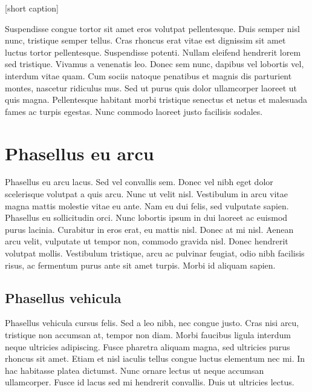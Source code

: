 \begin{center}
[short caption]{%
\kant[1-2]}
\end{center}

Suspendisse congue tortor sit amet eros volutpat pellentesque. Duis semper nisl nunc, tristique semper tellus. Cras rhoncus erat vitae est dignissim sit amet luctus tortor pellentesque. Suspendisse potenti. Nullam eleifend hendrerit lorem sed tristique. Vivamus a venenatis leo. Donec sem nunc, dapibus vel lobortis vel, interdum vitae quam. Cum sociis natoque penatibus et magnis dis parturient montes, nascetur ridiculus mus. Sed ut purus quis dolor ullamcorper laoreet ut quis magna. Pellentesque habitant morbi tristique senectus et netus et malesuada fames ac turpis egestas. Nunc commodo laoreet justo facilisis sodales. 

\section{Phasellus eu arcu}

Phasellus eu arcu lacus. Sed vel convallis sem. Donec vel nibh eget dolor scelerisque volutpat a quis arcu. Nunc ut velit nisl. Vestibulum in arcu vitae magna mattis molestie vitae eu ante. Nam eu dui felis, sed vulputate sapien. Phasellus eu sollicitudin orci. Nunc lobortis ipsum in dui laoreet ac euismod purus lacinia. Curabitur in eros erat, eu mattis nisl. Donec at mi nisl. Aenean arcu velit, vulputate ut tempor non, commodo gravida nisl. Donec hendrerit volutpat mollis. Vestibulum tristique, arcu ac pulvinar feugiat, odio nibh facilisis risus, ac fermentum purus ante sit amet turpis. Morbi id aliquam sapien.

\subsection{Phasellus vehicula}

Phasellus vehicula cursus felis. Sed a leo nibh, nec congue justo. Cras nisi arcu, tristique non accumsan at, tempor non diam. Morbi faucibus ligula interdum neque ultricies adipiscing. Fusce pharetra aliquam magna, sed ultricies purus rhoncus sit amet. Etiam et nisl iaculis tellus congue luctus elementum nec mi. In hac habitasse platea dictumst. Nunc ornare lectus ut neque accumsan ullamcorper. Fusce id lacus sed mi hendrerit convallis. Duis ut ultricies lectus. 

